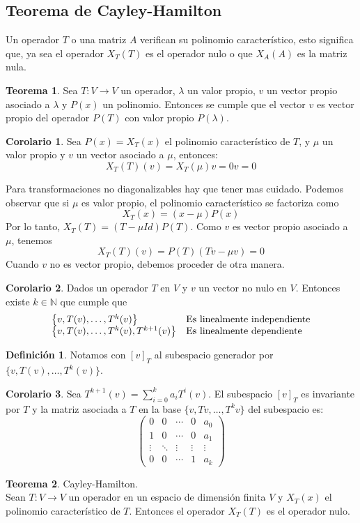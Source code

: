 \documentclass[10pt]{article}
\theoremstyle{definition}
\newtheorem{definition}{Definición}[section]
\newtheorem{theorem}{Teorema}[section]
\newtheorem{corollary}{Corolario}[theorem]
\begin{document}
\subsection{Teorema de Cayley-Hamilton}
Un operador $T$ o una matriz $A$ verifican su polinomio característico, esto significa que, ya sea el operador $X_T(T)$ es el operador nulo o que $X_A(A)$ es la matriz nula.
\begin{theorem}
	Sea $T:V\to V$ un operador, $\lambda$ un valor propio, $v$ un vector propio asociado a $\lambda$ y $P(x)$ un polinomio. Entonces se cumple que el vector $v$ es vector propio del operador $P(T)$ con valor propio $P(\lambda)$.
\end{theorem}
\begin{corollary}
	Sea $P(x)=X_T(x)$ el polinomio característico de $T$, y $\mu$ un valor propio y $v$ un vector asociado a $\mu$, entonces:
	$$X_T(T)(v)=X_T(\mu)v=0v=0$$
\end{corollary}
Para transformaciones no diagonalizables hay que tener mas cuidado. Podemos observar que si $\mu$ es valor propio, el polinomio característico se factoriza como $$X_T(x)=(x-\mu)P(x)$$
Por lo tanto, $X_T(T)=(T-\mu Id)P(T)$. Como $v$ es vector propio asociado a $\mu$, tenemos $$X_T(T)(v)=P(T)(Tv-\mu v)=0$$
Cuando $v$ no es vector propio, debemos proceder de otra manera.
\begin{corollary}
	Dados un operador $T$ en $V$ y $v$ un vector no nulo en $V$. Entonces existe $k\in\mathbb{N}$ que cumple que
	$$\begin{array}{ l l }
			\left\{v,T( v) ,\dotsc ,T^{k}( v)\right\}              & \text{Es linealmente independiente} \\
			\left\{v,T( v) ,\dotsc ,T^{k}( v) ,T^{k+1}( v)\right\} & \text{Es linealmente dependiente}
		\end{array}$$
\end{corollary}
\begin{definition}
	Notamos con $[v]_T$ al subespacio generador por $\{v,T(v),\dots,T^k(v)\}$.
\end{definition}
\begin{corollary}
	Sea $T^{k+1}(v)=\sum_{i=0}^{k} a_iT^i(v)$. El subespacio $[v]_T$ es invariante por $T$ y la matriz asociada a $T$ en la base $\{v,Tv,\dots,T^kv\}$ del subespacio es:
	$$\begin{pmatrix}
			0      & 0      & \cdots & 0      & a_{0}  \\
			1      & 0      & \cdots & 0      & a_{1}  \\
			\vdots & \ddots & \vdots & \vdots & \vdots \\
			0      & 0      & \cdots & 1      & a_{k}
		\end{pmatrix}$$
\end{corollary}
\begin{theorem}{Cayley-Hamilton.}
	\\Sean $T:V\to V$ un operador en un espacio de dimensión finita $V$ y $X_T(x)$ el polinomio característico de $T$. Entonces el operador $X_T(T)$ es el operador nulo.
\end{theorem}\newpage
\end{document}
